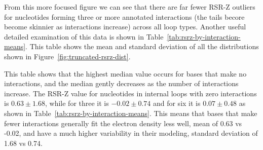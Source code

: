From this more focused figure we can see that there are far fewer RSR-Z outliers
for nucleotides forming three or more annotated interactions (the tails becore
become skinnier as interactions increase) across all loop types. Another useful
detailed examination of this data is shown in
Table~\ref{tab:rsrz-by-interaction-means}. This table shows the mean and
standard deviation of all the distributions shown in
Figure~\ref{fig:truncated-rsrz-dist}.

This table shows that the highest median value occurs for bases that make no
interactions, and the median gently decreases as the number of interactions
increase. The RSR-Z value for nucleotides in internal loops with zero
interactions is $0.63 \pm 1.68$, while for three it is $-0.02 \pm 0.74$ and for
six it is $0.07 \pm 0.48$ as shown in Table~\ref{tab:rsrz-by-interaction-means}.
This means that bases that make fewer interactions generally fit the electron
density less well, mean of 0.63 vs -0.02, and have a much higher variability in
their modeling, standard deviation of 1.68 vs 0.74.

